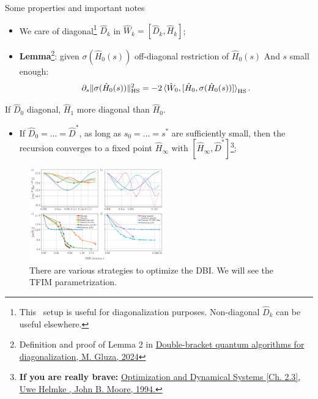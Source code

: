 \documentclass[aspectratio=169, 8pt, xcolor={svgnames}]{beamer}
\begin{document}
\begin{frame}{Some properties and important notes}
\begin{multicols}{2}
\begin{itemize}[noitemsep]
\item[1.] We care of diagonal\footnote{This \
   setup is useful for diagonalization purposes. Non-diagonal $\hat{D}_k$ can be useful elsewhere.} $\hat{D}_k$ in $\hat{W}_k = [\hat{D}_k, \hat{H}_k]$;
\item[2.] \textbf{Lemma}\footnote{Definition and proof of Lemma 2 in \href{https://arxiv.org/abs/2206.11772}{Double-bracket 
   quantum algorithms for diagonalization, M. Gluza, 2024}}: given $\sigma(\hat{H}_0(s))$ off-diagonal restriction of $\hat{H}_0(s)$ And
   $s$ small enough:
   $$ \partial_s \| \sigma(\hat{H}_0(s)) \|^2_{\rm HS} = - 2 \braket{ \hat{W}_0, [\hat{H}_0, \sigma(\hat{H}_0(s))] }_{\rm HS}. $$ 
\end{itemize}
\begin{tcolorbox}[colback=red!15, title=The key point]
If $\hat{D}_0$ diagonal, $\hat{H}_1$ more diagonal than $\hat{H}_0$.
\end{tcolorbox}
\begin{itemize}
\item[3.] If $\hat{D}_0 = ... = \hat{D}^*$, as long as $s_0 = ... = s^*$
   are sufficiently small, then the recursion converges to a fixed point $\hat{H}_{\infty}$
   with $[\hat{H}_{\infty}, \hat{D}^*]$\footnote{\textbf{If you are really brave:} 
   \href{https://link.springer.com/book/10.1007/978-1-4471-3467-1}{Optimization and Dynamical Systems [Ch. 2.3], Uwe Helmke , John B. Moore, 1994.}}; 
\end{itemize}
\begin{figure}
   \includegraphics[width=0.52\textwidth]{figures/opt_strategies.png}
   \caption{There are various strategies to optimize the DBI. We will see the TFIM parametrization.}
\end{figure}
\end{multicols}
\end{frame}
\end{document}
